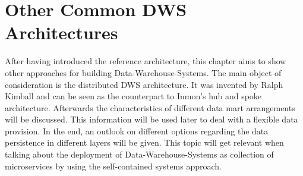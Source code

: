 \section{Other Common DWS Architectures}
\label{sec:otherArchitectures}
After having introduced the reference architecture, this chapter aims to show other approaches for building Data-Warehouse-Systems. The main object of consideration is the distributed DWS architecture. It was invented by Ralph Kimball and can be seen as the counterpart to Inmon's hub and spoke architecture.\newline
Afterwards the characteristics of different data mart arrangements will be discussed. This information will be used later to deal with a flexible data provision.\newline
In the end, an outlook on different options regarding the data persistence in different layers will be given. This topic will get relevant when talking about the deployment of Data-Warehouse-Systems as collection of microservices by using the self-contained systems approach.

